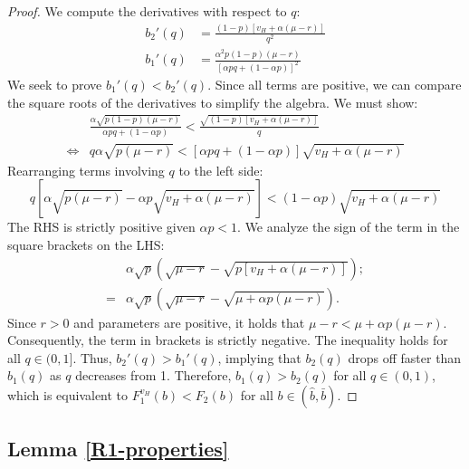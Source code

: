 \documentclass[11pt]{article}
\theoremstyle{plain}
\theoremstyle{definition}
\theoremstyle{plain}
\theoremstyle{plain}
\theoremstyle{plain}
\theoremstyle{plain}
\numberwithin{equation}{section}
\begin{document}
\begin{proof}
\noindent We compute the derivatives with respect to $q$:
\begin{align*}
    b_2'(q) &= \frac{(1-p)[v_H+\alpha(\mu-r)]}{q^2} \\[5pt]
    b_1'(q) &= \frac{\alpha^2 p (1-p)(\mu-r)}{[\alpha p q + (1-\alpha p)]^2}
\end{align*}
We seek to prove $b_1'(q) < b_2'(q)$. Since all terms are positive, we can compare the square roots of the derivatives to simplify the algebra. We must show:
\begin{align*}
    & \frac{\alpha \sqrt{p(1-p)(\mu-r)}}{\alpha p q + (1-\alpha p)} < \frac{\sqrt{(1-p)[v_H+\alpha(\mu-r)]}}{q} \\[5pt]
    \iff & q \alpha \sqrt{p(\mu-r)} < [\alpha p q + (1-\alpha p)] \sqrt{v_H+\alpha(\mu-r)}
\end{align*}
Rearranging terms involving $q$ to the left side:
\begin{equation*}
    q \left[ \alpha\sqrt{p(\mu-r)} - \alpha p \sqrt{v_H+\alpha(\mu-r)} \right] < (1-\alpha p)\sqrt{v_H+\alpha(\mu-r)}
\end{equation*}
The RHS is strictly positive given $\alpha p < 1$. We analyze the sign of the term in the square brackets on the LHS:
\begin{align*}
    &\alpha\sqrt{p} \left( \sqrt{\mu-r} - \sqrt{p[v_H+\alpha(\mu-r)]} \right); \\[5pt]
    = & \alpha\sqrt{p} \left( \sqrt{\mu-r} - \sqrt{\mu+\alpha p(\mu-r)} \right).
\end{align*}
Since $r > 0$ and parameters are positive, it holds that $\mu-r < \mu + \alpha p(\mu-r)$. Consequently, the term in brackets is strictly negative. The inequality holds for all $q \in (0, 1]$. Thus, $b_2'(q) > b_1'(q)$, implying that $b_2(q)$ drops off faster than $b_1(q)$ as $q$ decreases from 1. Therefore, $b_1(q) > b_2(q)$ for all $q \in (0, 1)$, which is equivalent to $F_1^{v_H}(b) < F_2(b)$ for all $b \in (\hat{b}, \bar{b})$.
\end{proof}
\vspace{0.4cm}

\subsection*{Lemma \ref{R1-properties}}
\end{document}
